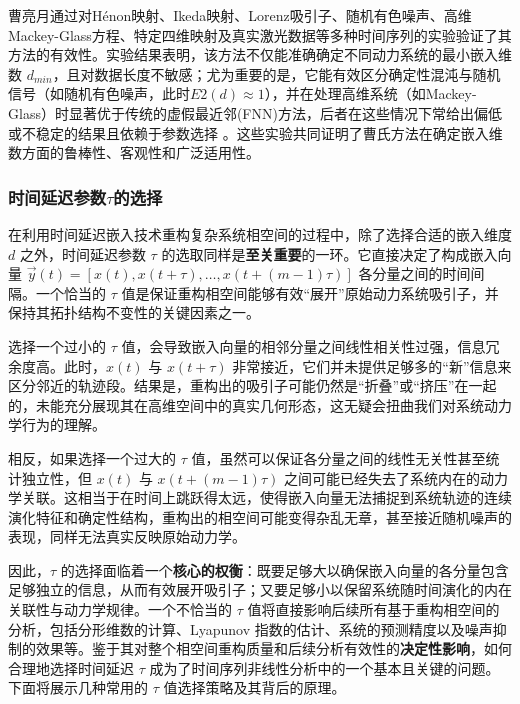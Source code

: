 曹亮月通过对Hénon映射、Ikeda映射、Lorenz吸引子、随机有色噪声、高维Mackey-Glass方程、特定四维映射及真实激光数据等多种时间序列的实验验证了其方法的有效性。实验结果表明，该方法不仅能准确确定不同动力系统的最小嵌入维数 $d_{min}$，且对数据长度不敏感；尤为重要的是，它能有效区分确定性混沌与随机信号（如随机有色噪声，此时$E2(d) \approx 1$），并在处理高维系统（如Mackey-Glass）时显著优于传统的虚假最近邻(FNN)方法，后者在这些情况下常给出偏低或不稳定的结果且依赖于参数选择 。这些实验共同证明了曹氏方法在确定嵌入维数方面的鲁棒性、客观性和广泛适用性。

\subsubsection{时间延迟参数$\tau$的选择}


在利用时间延迟嵌入技术重构复杂系统相空间的过程中，除了选择合适的嵌入维度 $d$ 之外，时间延迟参数 $\tau$ 的选取同样是\textbf{至关重要}的一环。它直接决定了构成嵌入向量 $\vec{y}(t) = [x(t), x(t+\tau), \dots, x(t+(m-1)\tau)]$ 各分量之间的时间间隔。一个恰当的 $\tau$ 值是保证重构相空间能够有效“展开”原始动力系统吸引子，并保持其拓扑结构不变性的关键因素之一。

选择一个过小的 $\tau$ 值，会导致嵌入向量的相邻分量之间线性相关性过强，信息冗余度高。此时，$x(t)$ 与 $x(t+\tau)$ 非常接近，它们并未提供足够多的“新”信息来区分邻近的轨迹段。结果是，重构出的吸引子可能仍然是“折叠”或“挤压”在一起的，未能充分展现其在高维空间中的真实几何形态，这无疑会扭曲我们对系统动力学行为的理解。

相反，如果选择一个过大的 $\tau$ 值，虽然可以保证各分量之间的线性无关性甚至统计独立性，但 $x(t)$ 与 $x(t+(m-1)\tau)$ 之间可能已经失去了系统内在的动力学关联。这相当于在时间上跳跃得太远，使得嵌入向量无法捕捉到系统轨迹的连续演化特征和确定性结构，重构出的相空间可能变得杂乱无章，甚至接近随机噪声的表现，同样无法真实反映原始动力学。

因此，$\tau$ 的选择面临着一个\textbf{核心的权衡}：既要足够大以确保嵌入向量的各分量包含足够独立的信息，从而有效展开吸引子；又要足够小以保留系统随时间演化的内在关联性与动力学规律。一个不恰当的 $\tau$ 值将直接影响后续所有基于重构相空间的分析，包括分形维数的计算、Lyapunov 指数的估计、系统的预测精度以及噪声抑制的效果等。鉴于其对整个相空间重构质量和后续分析有效性的\textbf{决定性影响}，如何合理地选择时间延迟 $\tau$ 成为了时间序列非线性分析中的一个基本且关键的问题。下面将展示几种常用的 $\tau$ 值选择策略及其背后的原理。


